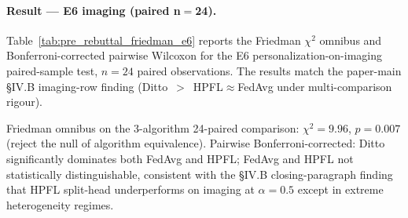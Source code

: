 \documentclass[conference]{IEEEtran}
\begin{document}
\begin{table}[htbp]
\centering
\caption{Friedman $\chi^2$ omnibus for MIA AUC on Cardiovascular across three DP levels, multi-seed $n{=}10$. Friedman fails to reject the null at No-DP and $\varepsilon{=}10$, confirming the K1/K2 multi-seed finding.}
\label{tab:pre_rebuttal_friedman_mia_cv}
\small
{}
\end{table}

\paragraph{Result --- E6 imaging (paired n$=$24).} Table~\ref{tab:pre_rebuttal_friedman_e6} reports the Friedman $\chi^2$ omnibus and Bonferroni-corrected pairwise Wilcoxon for the E6 personalization-on-imaging paired-sample test, $n{=}24$ paired observations. The results match the paper-main §IV.B imaging-row finding (Ditto~$>$~HPFL$\approx$FedAvg under multi-comparison rigour).

\begin{table}[htbp]
\centering
\caption{Friedman $\chi^2$ omnibus and Bonferroni-corrected pairwise Wilcoxon for E6 imaging personalization comparison, paired $n{=}24$. Bonferroni $\alpha_{\text{single}}{=}0.0167$.}
\label{tab:pre_rebuttal_friedman_e6}
\small
{}

\vspace{1mm}
\footnotesize{Friedman omnibus on the 3-algorithm 24-paired comparison: $\chi^2{=}9.96$, $p{=}0.007$ (reject the null of algorithm equivalence). Pairwise Bonferroni-corrected: Ditto significantly dominates both FedAvg and HPFL; FedAvg and HPFL not statistically distinguishable, consistent with the §IV.B closing-paragraph finding that HPFL split-head underperforms on imaging at $\alpha{=}0.5$ except in extreme heterogeneity regimes.}
\end{table}
\end{document}

